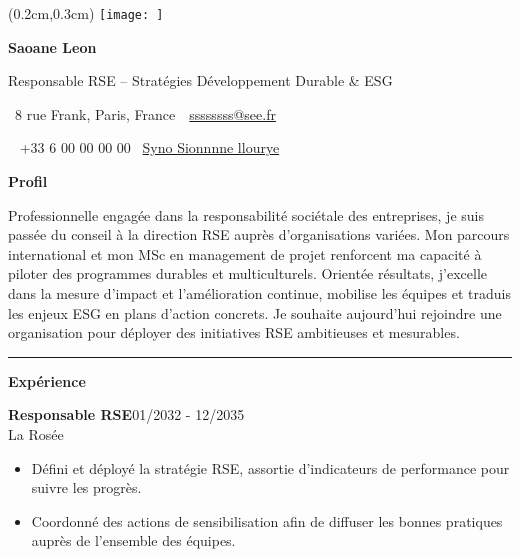\documentclass[a4paper]{article}
\renewcommand{\colorbox}[2]{#2}%
\newcommand{\fullrule}{\hspace{-1.5cm}\rule{\paperwidth}{0.4pt}}
\newcommand{\cvsection}[1]{%
  \vspace{6pt}\textbf{\Large #1}\par\vspace{2pt}}
\begin{document}
\ifx\relax\relax\else
\begin{textblock*}{4cm}(0.2cm,0.3cm)
  \texttt{[image: ]}
\end{textblock*}
 \fi
\begin{center}
  {\fontsize{44pt}{24pt}\selectfont\bfseries Saoane Leon}

  \bigskip
  {\Large Responsable RSE – Stratégies Développement Durable \& ESG}

  \bigskip\bigskip
  \faMapMarker~8 rue Frank, Paris, France\ 
  \quad\faEnvelope~\href{mailto:ssssssss@see.fr}{ssssssss@see.fr}

  \bigskip
  \faPhone~ +33 6 00 00 00 00
  \quad \faLinkedin\ \href{Syno Sionnnne llourye}{Syno Sionnnne llourye}
 

  
\end{center}
 \vspace{0.6cm}
\cvsection{Profil}
\vspace{0.3cm}
Professionnelle engagée dans la responsabilité sociétale des entreprises, je suis passée du conseil à la direction RSE auprès d’organisations variées. Mon parcours international et mon MSc en management de projet renforcent ma capacité à piloter des programmes durables et multiculturels. Orientée résultats, j’excelle dans la mesure d’impact et l’amélioration continue, mobilise les équipes et traduis les enjeux ESG en plans d’action concrets. Je souhaite aujourd’hui rejoindre une organisation pour déployer des initiatives RSE ambitieuses et mesurables.

\medskip\fullrule

\cvsection{Expérience}
\vspace{0.3cm}
\colorbox{maincolor}{%
  \begin{minipage}{\linewidth}
    \noindent
    \textbf{Responsable RSE}\hfill 01/2032 - 12/2035\\
    La Rosée\\[-0.3em]
    \begin{itemize}[leftmargin=*]
      \item Défini et déployé la stratégie RSE, assortie d’indicateurs de performance pour suivre les progrès. \item Coordonné des actions de sensibilisation afin de diffuser les bonnes pratiques auprès de l’ensemble des équipes.
    \end{itemize}
  \end{minipage}}
\end{document}
